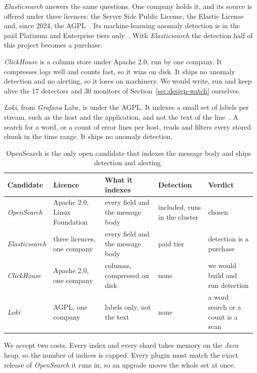 \textit{Elasticsearch} answers the same questions. One company holds it, and its source is offered under three licences: the Server Side Public License, the Elastic License and, since 2024, the AGPL~\cite{ref:elasticlicence}. Its machine-learning anomaly detection is in the paid Platinum and Enterprise tiers only~\cite{ref:elasticsubs}. With \textit{Elasticsearch} the detection half of this project becomes a purchase.

\textit{ClickHouse} is a column store under Apache 2.0, run by one company. It compresses logs well and counts fast, so it wins on disk. It ships no anomaly detection and no alerting, so it loses on machinery. We would write, run and keep alive the 17 detectors and 30 monitors of Section~\ref{sec:design-watch} ourselves.

\textit{Loki}, from \textit{Grafana} Labs, is under the AGPL. It indexes a small set of labels per stream, such as the host and the application, and not the text of the line~\cite{ref:lokilabels}. A search for a word, or a count of error lines per host, reads and filters every stored chunk in the time range. It ships no anomaly detection.

\begin{table}[htbp]\caption{OpenSearch is the only open candidate that indexes the message body and ships detection and alerting.}\label{tab:stores}\centering\footnotesize
\begin{tabularx}{\textwidth}{l L{2.3cm} L{3.2cm} L{2.3cm} Y}
\toprule
Candidate & Licence & What it indexes & Detection & Verdict \\
\midrule
\textit{OpenSearch} & Apache 2.0, Linux Foundation & every field and the message body & included, runs in the cluster & chosen \\
\textit{Elasticsearch} & three licences, one company & every field and the message body & paid tier & detection is a purchase \\
\textit{ClickHouse} & Apache 2.0, one company & columns, compressed on disk & none & we would build and run detection \\
\textit{Loki} & AGPL, one company & labels only, not the text & none & a word search or a count is a scan \\
\bottomrule
\end{tabularx}
\end{table}

We accept two costs. Every index and every shard takes memory on the \textit{Java} heap, so the number of indices is capped. Every plugin must match the exact release of \textit{OpenSearch} it runs in, so an upgrade moves the whole set at once.

